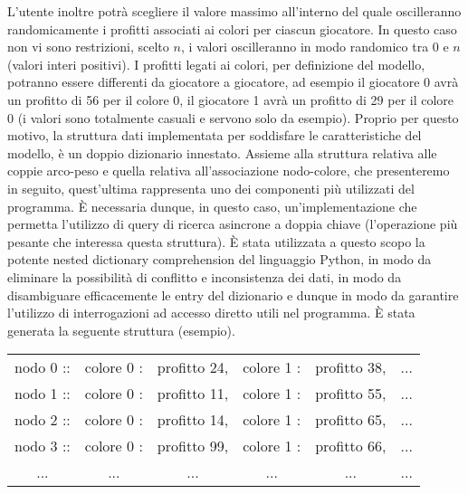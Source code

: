 L'utente inoltre potrà scegliere il valore massimo all'interno del quale oscilleranno randomicamente i profitti associati ai colori per ciascun giocatore. In questo caso non vi sono restrizioni, scelto \(n\), i valori oscilleranno in modo randomico tra $0$ e \(n\) (valori interi positivi). I profitti legati ai colori, per definizione del modello, potranno essere differenti da giocatore a giocatore, ad esempio il giocatore 0 avrà un profitto di 56 per il colore 0, il giocatore 1 avrà un profitto di 29 per il colore 0 (i valori sono totalmente casuali e servono solo da esempio). Proprio per questo motivo, la struttura dati implementata per soddisfare le caratteristiche del modello, è un doppio dizionario innestato. Assieme alla struttura relativa alle coppie arco-peso e quella relativa all'associazione nodo-colore, che presenteremo in seguito, quest'ultima rappresenta uno dei componenti più utilizzati del programma. È necessaria dunque, in questo caso, un'implementazione che permetta l'utilizzo di query di ricerca asincrone a doppia chiave (l'operazione più pesante che interessa questa struttura). È stata utilizzata a questo scopo la potente nested dictionary comprehension del linguaggio Python, in modo da eliminare la possibilità di conflitto e inconsistenza dei dati, in modo da disambiguare efficacemente le entry del dizionario e dunque in modo da garantire l'utilizzo di interrogazioni ad accesso diretto utili nel programma. È stata generata la seguente struttura (esempio).

\begin{table}[H]
\centering
\begin{tabular}{llllll}
\multicolumn{1}{c}{nodo 0 ::} & \multicolumn{1}{c}{colore 0 :} & \multicolumn{1}{c}{profitto 24,} & \multicolumn{1}{c}{colore 1 :} & \multicolumn{1}{c}{profitto 38,} & \multicolumn{1}{c}{...} \\
nodo 1 :: & colore 0 : & profitto 11, & colore 1 : & profitto 55, & ... \\
nodo 2 :: & colore 0 : & profitto 14, & colore 1 : & profitto 65, & ... \\
nodo 3 :: & colore 0 : & profitto 99, & colore 1 : & profitto 66, & ... \\
\multicolumn{1}{c}{...} & \multicolumn{1}{c}{...} & \multicolumn{1}{c}{...} & \multicolumn{1}{c}{...} & \multicolumn{1}{c}{...} & \multicolumn{1}{c}{...}
\end{tabular}
\end{table}

